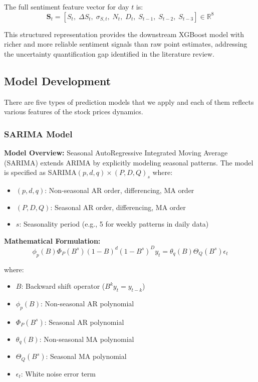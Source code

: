 \documentclass[12pt,a4paper]{article}
\begin{document}
\vspace{0.5cm}
\noindent The full sentiment feature vector for day $t$ is:
\begin{equation}
\mathbf{S}_t = \left[S_t,\; \Delta S_t,\; \sigma_{S,t},\; N_t,\; D_t,\; S_{t-1},\; S_{t-2},\; S_{t-3}\right] \in \mathbb{R}^8
\end{equation}

This structured representation provides the downstream XGBoost model with richer and more reliable sentiment signals than raw point estimates, addressing the uncertainty quantification gap identified in the literature review.

\subsection{Model Development}

There are five types of prediction models that we apply and each of them reflects various features of the stock prices dynamics.

\subsubsection{SARIMA Model}

\textbf{Model Overview:}
Seasonal AutoRegressive Integrated Moving Average (SARIMA) extends ARIMA by explicitly modeling seasonal patterns. The model is specified as SARIMA$(p, d, q) \times (P, D, Q)_s$ where:

\begin{itemize}
    \item $(p, d, q)$: Non-seasonal AR order, differencing, MA order
    \item $(P, D, Q)$: Seasonal AR order, differencing, MA order
    \item $s$: Seasonality period (e.g., 5 for weekly patterns in daily data)
\end{itemize}

\textbf{Mathematical Formulation:}
\begin{equation}
\phi_p(B)\Phi_P(B^s)(1-B)^d(1-B^s)^D y_t = \theta_q(B)\Theta_Q(B^s)\epsilon_t
\end{equation}

where:
\begin{itemize}
    \item $B$: Backward shift operator ($B^k y_t = y_{t-k}$)
    \item $\phi_p(B)$: Non-seasonal AR polynomial
    \item $\Phi_P(B^s)$: Seasonal AR polynomial
    \item $\theta_q(B)$: Non-seasonal MA polynomial
    \item $\Theta_Q(B^s)$: Seasonal MA polynomial
    \item $\epsilon_t$: White noise error term
\end{itemize}
\end{document}
